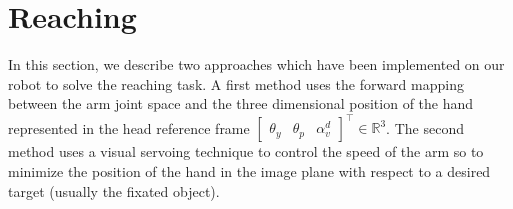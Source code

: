 \section{Reaching}
\label{sec:reaching}

In this section, we describe two approaches which have been 
implemented on our robot to solve the reaching task. A first method 
uses the forward mapping between the arm joint space and the three 
dimensional position of the hand represented in the head reference 
frame $\begin{bmatrix} \theta_y & \theta_p & \alpha_v^d\end{bmatrix}^\top \in \mathbb R^3$. 
The second method uses a visual servoing technique to control the 
speed of the arm so to minimize the position of the hand in the 
image plane with respect to a desired target (usually the fixated object).

